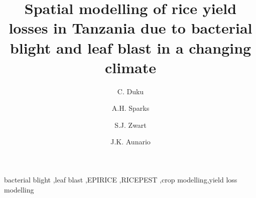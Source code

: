 \documentclass[preprint,12pt]{elsarticle}
\begin{document}
\begin{frontmatter}



\title{Spatial modelling of rice yield losses in Tanzania due to bacterial blight and leaf blast in a changing climate} 


\author[AfricaRice]{C. Duku}
\author[IRRI]{A.H. Sparks}
\author[AfricaRice]{S.J. Zwart}
\author[IRRI]{J.K. Aunario}


\address[AfricaRice]{Africa Rice Center (AfricaRice), 01 BP 2031, Cotonou, BENIN}
\address[IRRI]{International Rice Research Institute (IRRI), DAPO Box 7777, Metro Manila, 1301, PHILIPPINES}

\begin{abstract}

\end{abstract}

\begin{keyword}
bacterial blight \sep leaf blast \sep EPIRICE \sep RICEPEST \sep crop modelling\sep yield loss modelling
\end{keyword}

\end{frontmatter}



\linenumbers
\end{document}
